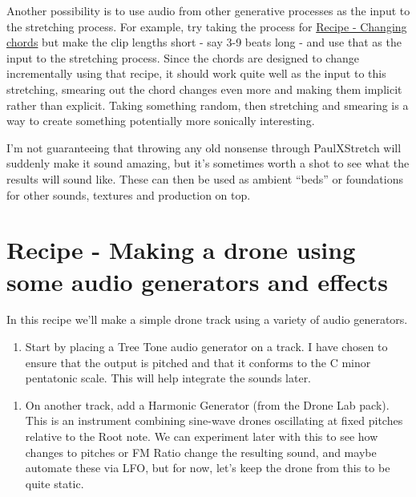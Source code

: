\documentclass[
  12pt,
  letterpaper,
  oneside,
  open=any]{scrbook}
\makeatletter
\providecommand{\tightlist}{%
  \setlength{\itemsep}{0pt}\setlength{\parskip}{0pt}}\usepackage{longtable,booktabs,array}
\newcommand*\pandocbounded[1]{%
  \sbox\pandoc@box{#1}%
  \Gscale@div\@tempa{\textheight}{\dimexpr\ht\pandoc@box+\dp\pandoc@box\relax}%
  \Gscale@div\@tempb{\linewidth}{\wd\pandoc@box}%
  \ifdim\@tempb\p@<\@tempa\p@\let\@tempa\@tempb\fi%
  \ifdim\@tempa\p@<\p@\scalebox{\@tempa}{\usebox\pandoc@box}%
  \else\usebox{\pandoc@box}%
  \fi%
}
\makeatother
\begin{document}
Another possibility is to use audio from other generative processes as
the input to the stretching process. For example, try taking the process
for \hyperref[001-Recipe-Changing_Chords]{Recipe - Changing chords} but
make the clip lengths short - say 3-9 beats long - and use that as the
input to the stretching process. Since the chords are designed to change
incrementally using that recipe, it should work quite well as the input
to this stretching, smearing out the chord changes even more and making
them implicit rather than explicit. Taking something random, then
stretching and smearing is a way to create something potentially more
sonically interesting.

I'm not guaranteeing that throwing any old nonsense through PaulXStretch
will suddenly make it sound amazing, but it's sometimes worth a shot to
see what the results will sound like. These can then be used as ambient
``beds'' or foundations for other sounds, textures and production on
top.


\chapter{Recipe - Making a drone using some audio generators and
effects}\label{017-Recipe-Audio_generators_drone}

In this recipe we'll make a simple drone track using a variety of audio
generators.

\begin{enumerate}
\def\labelenumi{\arabic{enumi}.}
\tightlist
\item
  Start by placing a Tree Tone audio generator on a track. I have chosen
  to ensure that the output is pitched and that it conforms to the C
  minor pentatonic scale. This will help integrate the sounds later.
\end{enumerate}

\pandocbounded{\texttt{[image: images/Recipe5\_TreeTone.png]}}

\begin{enumerate}
\def\labelenumi{\arabic{enumi}.}
\setcounter{enumi}{1}
\tightlist
\item
  On another track, add a Harmonic Generator (from the Drone Lab pack).
  This is an instrument combining sine-wave drones oscillating at fixed
  pitches relative to the Root note. We can experiment later with this
  to see how changes to pitches or FM Ratio change the resulting sound,
  and maybe automate these via LFO, but for now, let's keep the drone
  from this to be quite static.
\end{enumerate}
\end{document}
